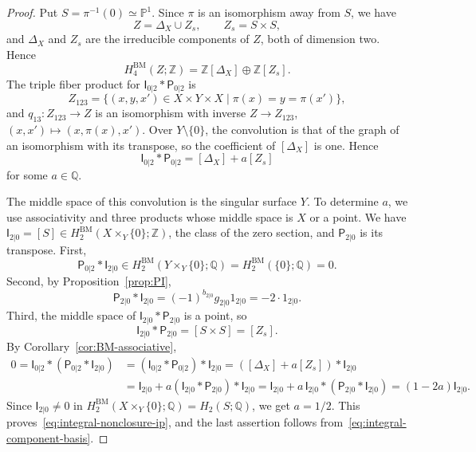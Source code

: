 \documentclass[11pt,a4paper]{amsart}
\theoremstyle{definition}
\theoremstyle{remark}
\newcommand{\Q}{\mathbb Q}
\newcommand{\BM}{\mathrm{BM}}
\numberwithin{equation}{section}
\begin{document}
\begin{proof}
Put $S=\pi^{-1}(0)\simeq\mathbb P^1$. Since $\pi$ is an isomorphism
away from $S$, we have
$$
 Z=\Delta_X\cup Z_s,\qquad Z_s=S\times S,
$$
and $\Delta_X$ and $Z_s$ are the irreducible components of $Z$, both of
dimension two. Hence
\begin{equation}\label{eq:integral-component-basis}
 H^{\BM}_4(Z;\mathbb Z)
 =\mathbb Z[\Delta_X]\oplus\mathbb Z[Z_s].
\end{equation}
The triple fiber product for $\mathsf I_{0|2}*\mathsf P_{0|2}$ is
$$
 Z_{123}=\{(x,y,x')\in X\times Y\times X \mid
                      \pi(x)=y=\pi(x')\},
$$
and $q_{13}:Z_{123}\to Z$ is an isomorphism with inverse
$Z\to Z_{123}$, $(x,x')\mapsto(x,\pi(x),x')$. Over $Y\setminus\{0\}$, the
convolution is that of the graph of an isomorphism with its transpose, so
the coefficient of $[\Delta_X]$ is one. Hence
\begin{equation}\label{eq:integral-ip-unknown}
 \mathsf I_{0|2}*\mathsf P_{0|2}=[\Delta_X]+a[Z_s]
\end{equation}
for some $a\in\Q$.

The middle space of this convolution is the singular surface $Y$. To
determine $a$, we use associativity and three products whose middle
space is $X$ or a point. We have
$\mathsf I_{2|0}=[S]\in H^{\BM}_2(X\times_Y\{0\};\mathbb Z)$, the class
of the zero section, and $\mathsf P_{2|0}$ is its transpose. First,
$$
 \mathsf P_{0|2}*\mathsf I_{2|0}\in H^{\BM}_2(Y\times_Y\{0\};\Q)
 =H^{\BM}_2(\{0\};\Q)=0.
$$
Second, by Proposition~\ref{prop:PI},
\begin{equation}\label{eq:integral-qj}
 \mathsf P_{2|0}*\mathsf I_{2|0}=(-1)^{b_{2|0}}g_{2|0}1_{2|0}=-2\cdot1_{2|0}.
\end{equation}
Third, the middle space of $\mathsf I_{2|0}*\mathsf P_{2|0}$ is a point,
so
\begin{equation}\label{eq:integral-jq}
 \mathsf I_{2|0}*\mathsf P_{2|0}=[S\times S]=[Z_s].
\end{equation}
By Corollary~\ref{cor:BM-associative},
$$
\begin{aligned}
 0=\mathsf I_{0|2}*(\mathsf P_{0|2}*\mathsf I_{2|0})
  &=(\mathsf I_{0|2}*\mathsf P_{0|2})*\mathsf I_{2|0}
    =([\Delta_X]+a[Z_s])*\mathsf I_{2|0}\\
  &=\mathsf I_{2|0}+a(\mathsf I_{2|0}*\mathsf P_{2|0})*\mathsf I_{2|0}
    =\mathsf I_{2|0}+a\,\mathsf I_{2|0}*(\mathsf P_{2|0}*\mathsf I_{2|0})
    =(1-2a)\mathsf I_{2|0}.
\end{aligned}
$$
Since $\mathsf I_{2|0}\ne0$ in $H^{\BM}_2(X\times_Y\{0\};\Q)=H_2(S;\Q)$,
we get $a=1/2$. This proves~\eqref{eq:integral-nonclosure-ip}, and the
last assertion follows from~\eqref{eq:integral-component-basis}.
\end{proof}
\end{document}
